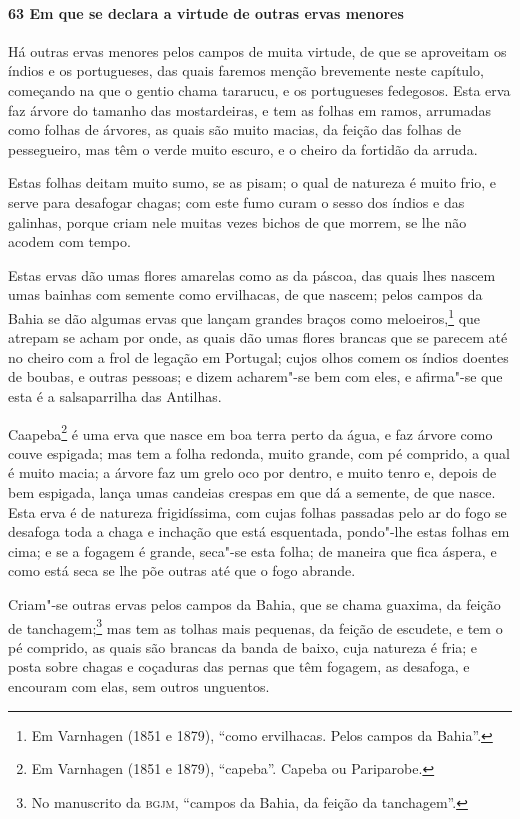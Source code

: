 \begin{linenumbers}
\paragraph{63 Em que se declara a virtude de outras ervas menores}\quad
Há outras ervas menores pelos campos de muita virtude, de que se aproveitam os índios e os
portugueses, das quais faremos menção brevemente neste capítulo, começando na que o gentio
chama tararucu, e os portugueses fedegosos. Esta erva faz árvore do tamanho das
mostardeiras, e tem as folhas em ramos, arrumadas como folhas de árvores, as quais são
muito macias, da feição das folhas de pessegueiro, mas têm o verde muito escuro, e o
cheiro da fortidão da arruda.

Estas folhas deitam muito sumo, se as pisam; o qual de natureza é muito frio, e serve para
desafogar chagas; com este fumo curam o sesso dos índios e das galinhas, porque criam nele
muitas vezes bichos de que morrem, se lhe não acodem com tempo.

Estas ervas dão umas flores amarelas como as da páscoa, das quais lhes nascem umas bainhas
com semente como ervilhacas, de que nascem; pelos campos da Bahia se dão algumas ervas que
lançam grandes braços como meloeiros,\footnote{ Em Varnhagen (1851 e 1879), ``como
ervilhacas. Pelos campos da Bahia''.} que atrepam se acham por onde, as quais dão umas
flores brancas que se parecem até no cheiro com a frol de legação em Portugal; cujos olhos
comem os índios doentes de boubas, e outras pessoas; e dizem acharem"-se bem com eles, e
afirma"-se que esta é a salsaparrilha das Antilhas.

Caapeba\footnote{ Em Varnhagen (1851 e 1879), ``capeba''. Capeba ou Pariparobe.} é uma
erva que nasce em boa terra perto da água, e faz árvore como couve espigada; mas tem a
folha redonda, muito grande, com pé comprido, a qual é muito macia; a árvore faz um grelo
oco por dentro, e muito tenro e, depois de bem espigada, lança umas candeias crespas em
que dá a semente, de que nasce. Esta erva é de natureza frigidíssima, com cujas folhas
passadas pelo ar do fogo se desafoga toda a chaga e inchação que está esquentada,
pondo"-lhe estas folhas em cima; e se a fogagem é grande, seca"-se esta folha; de maneira
que fica áspera, e como está seca se lhe põe outras até que o fogo abrande.

Criam"-se outras ervas pelos campos da Bahia, que se chama guaxima, da feição de
tanchagem;\footnote{ No manuscrito da \textsc{bgjm}, ``campos da Bahia, da feição da
tanchagem''.} mas tem as tolhas mais pequenas, da feição de escudete, e tem o pé comprido,
as quais são brancas da banda de baixo, cuja natureza é fria; e posta sobre chagas e
coçaduras das pernas que têm fogagem, as desafoga, e encouram com elas, sem outros
unguentos.


\end{linenumbers}
